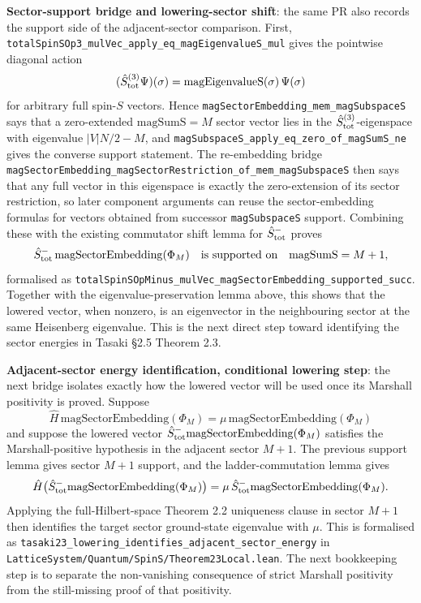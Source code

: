 \documentclass[a4paper,11pt]{article}
\begin{document}
\textbf{Sector-support bridge and lowering-sector shift}: the same PR
also records the support side of the adjacent-sector comparison.  First,
\texttt{totalSpinSOp3\_mulVec\_apply\_eq\_magEigenvalueS\_mul} gives the
pointwise diagonal action
\[
  (\hat S^{(3)}_{\rm tot}\Psi)(\sigma)
  = \mathrm{magEigenvalueS}(\sigma)\,\Psi(\sigma)
\]
for arbitrary full spin-$S$ vectors.  Hence
\texttt{magSectorEmbedding\_mem\_magSubspaceS} says that a zero-extended
\(\mathrm{magSumS}=M\) sector vector lies in the
\(\hat S^{(3)}_{\rm tot}\)-eigenspace with eigenvalue
\(|V|N/2 - M\), and
\texttt{magSubspaceS\_apply\_eq\_zero\_of\_magSumS\_ne} gives the converse
support statement.  The re-embedding bridge
\texttt{magSectorEmbedding\_magSectorRestriction\_of\_mem\_magSubspaceS}
then says that any full vector in this eigenspace is exactly the
zero-extension of its sector restriction, so later component arguments
can reuse the sector-embedding formulas for vectors obtained from
successor \texttt{magSubspaceS} support.  Combining these with the
existing commutator shift lemma for \(\hat S^-_{\rm tot}\) proves
\[
  \hat S^-_{\rm tot}\,
    \mathrm{magSectorEmbedding}(\Phi_M)
  \quad\text{is supported on}\quad
  \mathrm{magSumS}=M+1,
\]
formalised as
\texttt{totalSpinSOpMinus\_mulVec\_magSectorEmbedding\_supported\_succ}.
Together with the eigenvalue-preservation lemma above, this shows that
the lowered vector, when nonzero, is an eigenvector in the neighbouring
sector at the same Heisenberg eigenvalue.  This is the next direct step
toward identifying the sector energies in Tasaki §2.5 Theorem 2.3.

\textbf{Adjacent-sector energy identification, conditional lowering step}:
the next bridge isolates exactly how the lowered vector will be used once
its Marshall positivity is proved.  Suppose
\[
  \hat H\,\mathrm{magSectorEmbedding}(\Phi_M)
    = \mu\,\mathrm{magSectorEmbedding}(\Phi_M)
\]
and suppose the lowered vector
\(\hat S^-_{\rm tot}\mathrm{magSectorEmbedding}(\Phi_M)\) satisfies the
Marshall-positive hypothesis in the adjacent sector \(M+1\).  The previous
support lemma gives sector \(M+1\) support, and the ladder-commutation lemma
gives
\[
  \hat H\bigl(\hat S^-_{\rm tot}\mathrm{magSectorEmbedding}(\Phi_M)\bigr)
    =
  \mu\,\hat S^-_{\rm tot}\mathrm{magSectorEmbedding}(\Phi_M).
\]
Applying the full-Hilbert-space Theorem 2.2 uniqueness clause in sector
\(M+1\) then identifies the target sector ground-state eigenvalue with
\(\mu\).  This is formalised as
\texttt{tasaki23\_lowering\_identifies\_adjacent\_sector\_energy} in
\texttt{LatticeSystem/Quantum/SpinS/Theorem23Local.lean}.  The next
bookkeeping step is to separate the non-vanishing consequence of strict
Marshall positivity from the still-missing proof of that positivity.
\end{document}
